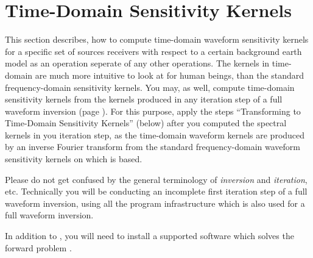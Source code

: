 \section*{Time-Domain Sensitivity Kernels} \label{guide,sec:time_kernels}
%
%
This section describes, how to compute time-domain waveform sensitivity kernels for a specific set 
of sources receivers with respect to a certain background earth model as an operation seperate of any
other \ASKI operations. The kernels in time-domain are much more intuitive to look at for human beings, 
than the standard frequency-domain sensitivity kernels. You may, as well, compute time-domain sensitivity 
kernels from the kernels produced in any iteration step of a full waveform inversion 
(page \pageref{guide,sec:classic_inversion}). For this purpose, apply the steps 
``Transforming to Time-Domain Sensitivity Kernels'' (below) after you computed the spectral kernels in 
you iteration step, as the time-domain waveform kernels are produced by an inverse Fourier transform 
from the standard frequency-domain waveform sensitivity kernels on which \ASKI is based.

Please do not get confused by the general terminology of \emph{inversion} and \emph{iteration}, etc. 
Technically you will be conducting an incomplete first iteration step of a full waveform inversion, 
using all the program infrastructure which is also used for a full waveform inversion. 

In addition to \ASKI {}, you will need to install a supported software which 
solves the forward problem .
%
